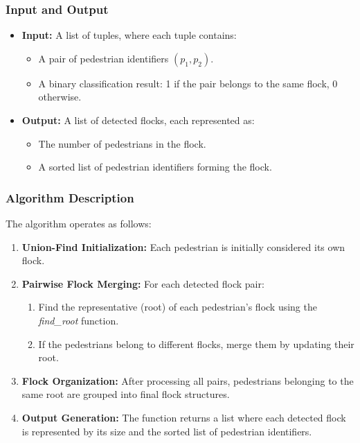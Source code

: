 \documentclass{article}
\begin{document}
\subsubsection{Input and Output}

\begin{itemize}
    \item \textbf{Input:} A list of tuples, where each tuple contains:
    \begin{itemize}
        \item A pair of pedestrian identifiers $(p_1, p_2)$.
        \item A binary classification result: 1 if the pair belongs to the same flock, 0 otherwise.
    \end{itemize}
    \item \textbf{Output:} A list of detected flocks, each represented as:
    \begin{itemize}
        \item The number of pedestrians in the flock.
        \item A sorted list of pedestrian identifiers forming the flock.
    \end{itemize}
\end{itemize}

\subsubsection{Algorithm Description}

The algorithm operates as follows:

\begin{enumerate}
    \item \textbf{Union-Find Initialization:} Each pedestrian is initially considered its own flock.
    \item \textbf{Pairwise Flock Merging:} For each detected flock pair:
    \begin{enumerate}
        \item Find the representative (root) of each pedestrian's flock using the \textit{find\_root} function.
        \item If the pedestrians belong to different flocks, merge them by updating their root.
    \end{enumerate}
    \item \textbf{Flock Organization:} After processing all pairs, pedestrians belonging to the same root are grouped into final flock structures.
    \item \textbf{Output Generation:} The function returns a list where each detected flock is represented by its size and the sorted list of pedestrian identifiers.
\end{enumerate}
\end{document}

